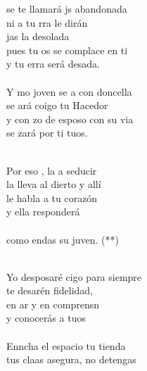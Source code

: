 \begin{cancion}%
	 se te llamará js abandonada \\
	ni a tu rra le dirán \\
	jas la desolada \\
	pues tu os se complace en ti \\
	y tu erra será desada.\\
\jump\\
	Y mo joven se a con doncella\\
	se ará coigo tu Hacedor\\
	y con zo de esposo con su via\\
	se zará por ti tuos. \\\jump\\
	\begin{chorus}%
	Por eso , la  a seducir\\
	la lleva al dierto y allí\\
	le habla a tu corazón \\
	y ella  responderá\\
{}\vspace*{-0.4cm}\\
	como endas su juven. (**)\\
	\end{chorus}%
	\jump\\
	Yo  desposaré cigo para siempre\\
	te desarén fidelidad,\\
	en ar y en comprensn \\
	y  conocerás a tuos\\
\jump\\
	Enncha el espacio tu tienda\\
	tus claas asegura, no  detengas\\

\end{cancion}
